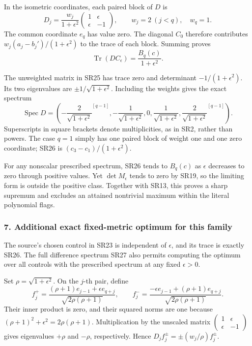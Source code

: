 In the isometric coordinates, each paired block of \(D\) is \[
D_j=\frac{w_j}{1+\epsilon^2}
\begin{pmatrix}1&\epsilon\\\epsilon&-1\end{pmatrix},\qquad
w_j=2\ (j<q),\quad w_q=1.
\tag{SR25}
\] The common coordinate \(e_q\) has value zero. The diagonal \(C_0\) therefore contributes \(w_j(a_j-b_j')/(1+\epsilon^2)\) to the trace of each block. Summing proves \[
\operatorname{Tr}(DC_\epsilon)=\frac{B_q(c)}{1+\epsilon^2}.
\tag{SR26}
\]

The unweighted matrix in SR25 has trace zero and determinant \(-1/(1+\epsilon^2)\). Its two eigenvalues are \(\pm1/\sqrt{1+\epsilon^2}\). Including the weights gives the exact spectrum \[
\operatorname{Spec}D
=\left(
-\frac{2}{\sqrt{1+\epsilon^2}}^{[q-1]},
-\frac{1}{\sqrt{1+\epsilon^2}},0,
\frac{1}{\sqrt{1+\epsilon^2}},
\frac{2}{\sqrt{1+\epsilon^2}}^{[q-1]}
\right).
\tag{SR27}
\] Superscripts in square brackets denote multiplicities, as in SR2, rather than powers. The case \(q=1\) simply has one paired block of weight one and one zero coordinate; SR26 is \((c_3-c_1)/(1+\epsilon^2)\).

For any nonscalar prescribed spectrum, SR26 tends to \(B_q(c)\) as \(\epsilon\) decreases to zero through positive values. Yet \(\det M_\epsilon\) tends to zero by SR19, so the limiting form is outside the positive class. Together with SR13, this proves a sharp supremum and excludes an attained nontrivial maximum within the literal polynomial flags.

\subsubsection{7. Additional exact fixed-metric optimum for this family}\label{endpoint-four_window_sharpness_review--additional-exact-fixed-metric-optimum-for-this-family}

The source's chosen control in SR23 is independent of \(\epsilon\), and its trace is exactly SR26. The full difference spectrum SR27 also permits computing the optimum over all controls with the prescribed spectrum at any fixed \(\epsilon>0\).

Set \(\rho=\sqrt{1+\epsilon^2}\). On the \(j\)-th pair, define \[
f_j^+=\frac{(\rho+1)e_{j-1}+\epsilon e_{q+j}}
{\sqrt{2\rho(\rho+1)}},\qquad
f_j^-=\frac{-\epsilon e_{j-1}+(\rho+1)e_{q+j}}
{\sqrt{2\rho(\rho+1)}}.
\tag{SR28}
\] Their inner product is zero, and their squared norms are one because \((\rho+1)^2+\epsilon^2=2\rho(\rho+1)\). Multiplication by the unscaled matrix \(\begin{pmatrix}1&\epsilon\\\epsilon&-1\end{pmatrix}\) gives eigenvalues \(+\rho\) and \(-\rho\), respectively. Hence \(D_j f_j^\pm=\pm(w_j/\rho)f_j^\pm\).

